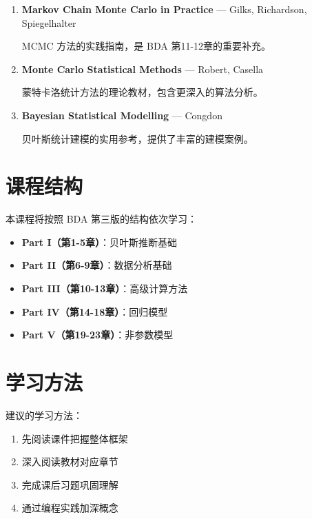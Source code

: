 \begin{enumerate}
  \item \textbf{Markov Chain Monte Carlo in Practice} — Gilks, Richardson, Spiegelhalter

  MCMC 方法的实践指南，是 BDA 第11-12章的重要补充。

  \item \textbf{Monte Carlo Statistical Methods} — Robert, Casella

  蒙特卡洛统计方法的理论教材，包含更深入的算法分析。

  \item \textbf{Bayesian Statistical Modelling} — Congdon

  贝叶斯统计建模的实用参考，提供了丰富的建模案例。
\end{enumerate}

\section{课程结构}

本课程将按照 BDA 第三版的结构依次学习：

\begin{itemize}
  \item \textbf{Part I（第1-5章）}：贝叶斯推断基础
  \item \textbf{Part II（第6-9章）}：数据分析基础
  \item \textbf{Part III（第10-13章）}：高级计算方法
  \item \textbf{Part IV（第14-18章）}：回归模型
  \item \textbf{Part V（第19-23章）}：非参数模型
\end{itemize}

\section{学习方法}

\begin{Remark}
  建议的学习方法：
  \begin{enumerate}
    \item 先阅读课件把握整体框架
    \item 深入阅读教材对应章节
    \item 完成课后习题巩固理解
    \item 通过编程实践加深概念
  \end{enumerate}
\end{Remark}

\endinput
